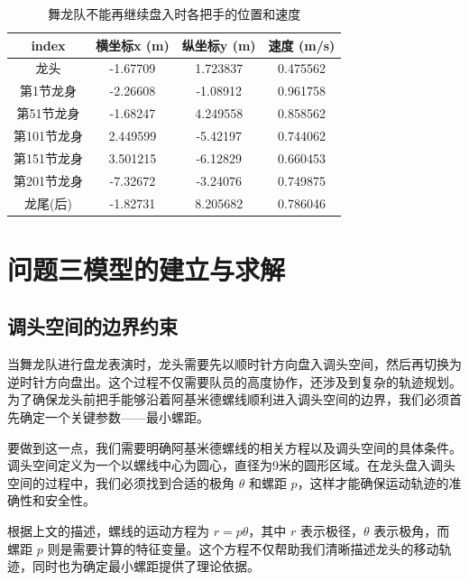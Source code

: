 \documentclass[withoutpreface, bwprint]{cumcmthesis} %
\begin{document}
\begin{table}[!h]
    \centering
    \caption{舞龙队不能再继续盘入时各把手的位置和速度}
    \label{tab:collision}
    \begin{tabular}{@{}cccc@{}}
        \toprule
        \textbf{index} & \textbf{横坐标x (m)} & \textbf{纵坐标y (m)} & \textbf{速度 (m/s)} \\ \midrule
        龙头             & -1.67709          & 1.723837          & 0.475562          \\
        第1节龙身          & -2.26608          & -1.08912          & 0.961758          \\
        第51节龙身         & -1.68247          & 4.249558          & 0.858562          \\
        第101节龙身        & 2.449599          & -5.42197          & 0.744062          \\
        第151节龙身        & 3.501215          & -6.12829          & 0.660453          \\
        第201节龙身        & -7.32672          & -3.24076          & 0.749875          \\
        龙尾(后)          & -1.82731          & 8.205682          & 0.786046          \\ \bottomrule
    \end{tabular}
\end{table}

\section{问题三模型的建立与求解}

\subsection{调头空间的边界约束}

当舞龙队进行盘龙表演时，龙头需要先以顺时针方向盘入调头空间，然后再切换为逆时针方向盘出。这个过程不仅需要队员的高度协作，还涉及到复杂的轨迹规划。为了确保龙头前把手能够沿着阿基米德螺线顺利进入调头空间的边界，我们必须首先确定一个关键参数——最小螺距。

要做到这一点，我们需要明确阿基米德螺线的相关方程以及调头空间的具体条件。调头空间定义为一个以螺线中心为圆心，直径为9米的圆形区域。在龙头盘入调头空间的过程中，我们必须找到合适的极角 $\theta$ 和螺距 $p$，这样才能确保运动轨迹的准确性和安全性。

根据上文的描述，螺线的运动方程为 $r = p\theta$，其中 $r$ 表示极径，$\theta$ 表示极角，而螺距 $p$ 则是需要计算的特征变量。这个方程不仅帮助我们清晰描述龙头的移动轨迹，同时也为确定最小螺距提供了理论依据。
\end{document}
